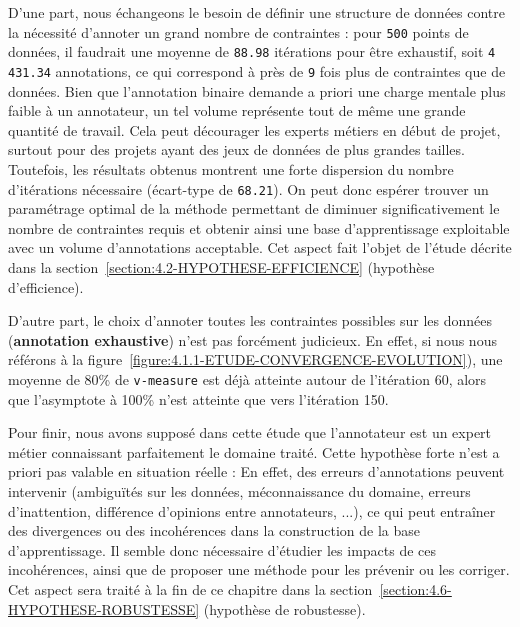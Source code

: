 				D'une part, nous échangeons le besoin de définir une structure de données contre la nécessité d'annoter un grand nombre de contraintes : pour \texttt{500} points de données, il faudrait une moyenne de \texttt{88.98} itérations pour être exhaustif, soit \texttt{4 431.34} annotations, ce qui correspond à près de \texttt{9} fois plus de contraintes que de données.
				Bien que l'annotation binaire demande a priori une charge mentale plus faible à un annotateur, un tel volume représente tout de même une grande quantité de travail. Cela peut décourager les experts métiers en début de projet, surtout pour des projets ayant des jeux de données de plus grandes tailles.
				Toutefois, les résultats obtenus montrent une forte dispersion du nombre d'itérations nécessaire (écart-type de \texttt{68.21}).
				On peut donc espérer trouver un paramétrage optimal de la méthode permettant de diminuer significativement le nombre de contraintes requis et obtenir ainsi une base d'apprentissage exploitable avec un volume d'annotations acceptable.
				Cet aspect fait l'objet de l'étude décrite dans la section~\ref{section:4.2-HYPOTHESE-EFFICIENCE} (hypothèse d'efficience).
				
				D'autre part, le choix d'annoter toutes les contraintes possibles sur les données (\textbf{annotation exhaustive}) n'est pas forcément judicieux.
				En effet, si nous nous référons à la figure~\ref{figure:4.1.1-ETUDE-CONVERGENCE-EVOLUTION}), une moyenne de 80\% de \texttt{v-measure} est déjà atteinte autour de l'itération 60, alors que l'asymptote à 100\% n'est atteinte que vers l'itération 150.
				
				Pour finir, nous avons supposé dans cette étude que l'annotateur est un expert métier connaissant parfaitement le domaine traité.
				Cette hypothèse forte n'est a priori pas valable en situation réelle : En effet, des erreurs d'annotations peuvent intervenir (ambiguïtés sur les données, méconnaissance du domaine, erreurs d'inattention, différence d'opinions entre annotateurs, ...), ce qui peut entraîner des divergences ou des incohérences dans la construction de la base d'apprentissage.
				Il semble donc nécessaire d'étudier les impacts de ces incohérences, ainsi que de proposer une méthode pour les prévenir ou les corriger.
				Cet aspect sera traité à la fin de ce chapitre dans la section~\ref{section:4.6-HYPOTHESE-ROBUSTESSE} (hypothèse de robustesse).
	

